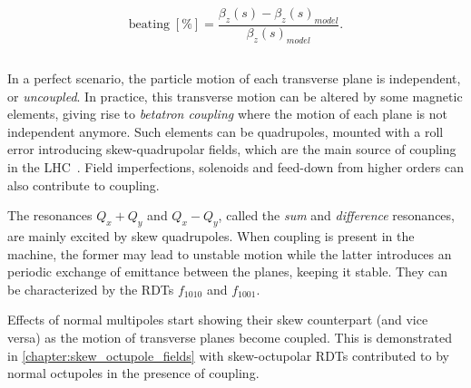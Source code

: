 \begin{equation}
    \mathrm{beating \; [\%]}  = \frac{\beta_z(s) - \beta_z(s)_{model}}{\beta_z(s)_{model}}.
    \label{eq:beam_optics:beating}
\end{equation}


\subsection{}

In a perfect scenario, the particle motion of each transverse plane is independent, or
\textit{uncoupled}. In practice, this transverse motion can be altered by some magnetic elements,
giving rise to \textit{betatron coupling} where the motion of each plane is not independent anymore.
Such elements can be quadrupoles, mounted with a roll error introducing skew-quadrupolar fields,
which are the main source of coupling in the LHC~\cite{felix_soubelet_local_2023}. Field
imperfections, solenoids and feed-down from higher orders can also contribute to coupling.

The resonances $Q_x + Q_y$ and $Q_x - Q_y$, called the \textit{sum} and \textit{difference}
resonances, are mainly excited by skew quadrupoles. When coupling is present in the
machine, the former may lead to unstable motion while the latter introduces an periodic exchange of
emittance between the planes, keeping it stable. They can be characterized by the RDTs $f_{1010}$
and $f_{1001}$.

Effects of normal multipoles start showing their skew counterpart (and vice versa) as the motion
of transverse planes become coupled. This is demonstrated in \cref{chapter:skew_octupole_fields}
with skew-octupolar RDTs contributed to by normal octupoles in the presence of coupling.


\subsection{}

